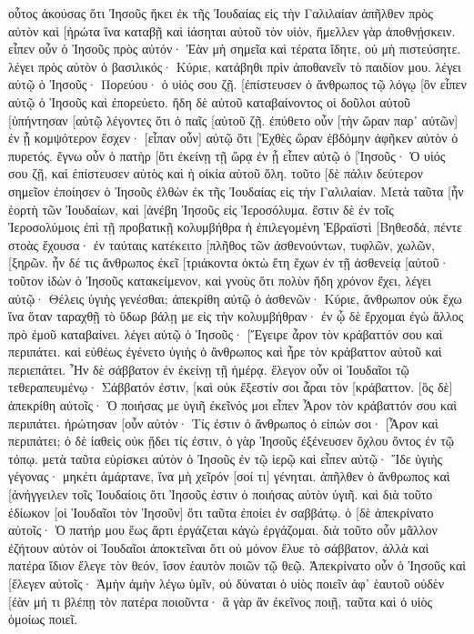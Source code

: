οὗτος ἀκούσας ὅτι Ἰησοῦς ἥκει ἐκ τῆς Ἰουδαίας εἰς τὴν Γαλιλαίαν ἀπῆλθεν πρὸς αὐτὸν καὶ [ἠρώτα ἵνα καταβῇ καὶ ἰάσηται αὐτοῦ τὸν υἱόν, ἤμελλεν γὰρ ἀποθνῄσκειν. 
εἶπεν οὖν ὁ Ἰησοῦς πρὸς αὐτόν· Ἐὰν μὴ σημεῖα καὶ τέρατα ἴδητε, οὐ μὴ πιστεύσητε. 
λέγει πρὸς αὐτὸν ὁ βασιλικός· Κύριε, κατάβηθι πρὶν ἀποθανεῖν τὸ παιδίον μου. 
λέγει αὐτῷ ὁ Ἰησοῦς· Πορεύου· ὁ υἱός σου ζῇ. [ἐπίστευσεν ὁ ἄνθρωπος τῷ λόγῳ [ὃν εἶπεν αὐτῷ ὁ Ἰησοῦς καὶ ἐπορεύετο. 
ἤδη δὲ αὐτοῦ καταβαίνοντος οἱ δοῦλοι αὐτοῦ [ὑπήντησαν [αὐτῷ λέγοντες ὅτι ὁ παῖς [αὐτοῦ ζῇ. 
ἐπύθετο οὖν [τὴν ὥραν παρ᾽ αὐτῶν] ἐν ᾗ κομψότερον ἔσχεν· [εἶπαν οὖν] αὐτῷ ὅτι [Ἐχθὲς ὥραν ἑβδόμην ἀφῆκεν αὐτὸν ὁ πυρετός. 
ἔγνω οὖν ὁ πατὴρ [ὅτι ἐκείνῃ τῇ ὥρᾳ ἐν ᾗ εἶπεν αὐτῷ ὁ [Ἰησοῦς· Ὁ υἱός σου ζῇ, καὶ ἐπίστευσεν αὐτὸς καὶ ἡ οἰκία αὐτοῦ ὅλη. 
τοῦτο [δὲ πάλιν δεύτερον σημεῖον ἐποίησεν ὁ Ἰησοῦς ἐλθὼν ἐκ τῆς Ἰουδαίας εἰς τὴν Γαλιλαίαν. 
Μετὰ ταῦτα [ἦν ἑορτὴ τῶν Ἰουδαίων, καὶ [ἀνέβη Ἰησοῦς εἰς Ἱεροσόλυμα. 
ἔστιν δὲ ἐν τοῖς Ἱεροσολύμοις ἐπὶ τῇ προβατικῇ κολυμβήθρα ἡ ἐπιλεγομένη Ἑβραϊστὶ [Βηθεσδά, πέντε στοὰς ἔχουσα· 
ἐν ταύταις κατέκειτο [πλῆθος τῶν ἀσθενούντων, τυφλῶν, χωλῶν, [ξηρῶν. 
ἦν δέ τις ἄνθρωπος ἐκεῖ [τριάκοντα ὀκτὼ ἔτη ἔχων ἐν τῇ ἀσθενείᾳ [αὐτοῦ· 
τοῦτον ἰδὼν ὁ Ἰησοῦς κατακείμενον, καὶ γνοὺς ὅτι πολὺν ἤδη χρόνον ἔχει, λέγει αὐτῷ· Θέλεις ὑγιὴς γενέσθαι; 
ἀπεκρίθη αὐτῷ ὁ ἀσθενῶν· Κύριε, ἄνθρωπον οὐκ ἔχω ἵνα ὅταν ταραχθῇ τὸ ὕδωρ βάλῃ με εἰς τὴν κολυμβήθραν· ἐν ᾧ δὲ ἔρχομαι ἐγὼ ἄλλος πρὸ ἐμοῦ καταβαίνει. 
λέγει αὐτῷ ὁ Ἰησοῦς· [Ἔγειρε ἆρον τὸν κράβαττόν σου καὶ περιπάτει. 
καὶ εὐθέως ἐγένετο ὑγιὴς ὁ ἄνθρωπος καὶ ἦρε τὸν κράβαττον αὐτοῦ καὶ περιεπάτει. Ἦν δὲ σάββατον ἐν ἐκείνῃ τῇ ἡμέρᾳ. 
ἔλεγον οὖν οἱ Ἰουδαῖοι τῷ τεθεραπευμένῳ· Σάββατόν ἐστιν, [καὶ οὐκ ἔξεστίν σοι ἆραι τὸν [κράβαττον. 
[ὃς δὲ] ἀπεκρίθη αὐτοῖς· Ὁ ποιήσας με ὑγιῆ ἐκεῖνός μοι εἶπεν Ἆρον τὸν κράβαττόν σου καὶ περιπάτει. 
ἠρώτησαν [οὖν αὐτόν· Τίς ἐστιν ὁ ἄνθρωπος ὁ εἰπών σοι· [Ἆρον καὶ περιπάτει; 
ὁ δὲ ἰαθεὶς οὐκ ᾔδει τίς ἐστιν, ὁ γὰρ Ἰησοῦς ἐξένευσεν ὄχλου ὄντος ἐν τῷ τόπῳ. 
μετὰ ταῦτα εὑρίσκει αὐτὸν ὁ Ἰησοῦς ἐν τῷ ἱερῷ καὶ εἶπεν αὐτῷ· Ἴδε ὑγιὴς γέγονας· μηκέτι ἁμάρτανε, ἵνα μὴ χεῖρόν [σοί τι] γένηται. 
ἀπῆλθεν ὁ ἄνθρωπος καὶ [ἀνήγγειλεν τοῖς Ἰουδαίοις ὅτι Ἰησοῦς ἐστιν ὁ ποιήσας αὐτὸν ὑγιῆ. 
καὶ διὰ τοῦτο ἐδίωκον [οἱ Ἰουδαῖοι τὸν Ἰησοῦν] ὅτι ταῦτα ἐποίει ἐν σαββάτῳ. 
ὁ [δὲ ἀπεκρίνατο αὐτοῖς· Ὁ πατήρ μου ἕως ἄρτι ἐργάζεται κἀγὼ ἐργάζομαι. 
διὰ τοῦτο οὖν μᾶλλον ἐζήτουν αὐτὸν οἱ Ἰουδαῖοι ἀποκτεῖναι ὅτι οὐ μόνον ἔλυε τὸ σάββατον, ἀλλὰ καὶ πατέρα ἴδιον ἔλεγε τὸν θεόν, ἴσον ἑαυτὸν ποιῶν τῷ θεῷ. 
Ἀπεκρίνατο οὖν ὁ Ἰησοῦς καὶ [ἔλεγεν αὐτοῖς· Ἀμὴν ἀμὴν λέγω ὑμῖν, οὐ δύναται ὁ υἱὸς ποιεῖν ἀφ᾽ ἑαυτοῦ οὐδὲν [ἐὰν μή τι βλέπῃ τὸν πατέρα ποιοῦντα· ἃ γὰρ ἂν ἐκεῖνος ποιῇ, ταῦτα καὶ ὁ υἱὸς ὁμοίως ποιεῖ. 
